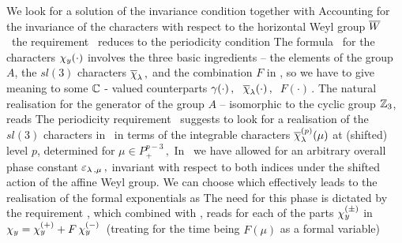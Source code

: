 We look for a  solution of the invariance condition
%
\eqn{}
%
together with 
%
\eqn{}
%
Accounting for the invariance of the characters
with respect to the horizontal Weyl
group $\overline W$  \resa\ the requirement \Vaa\ reduces to the
periodicity condition
%
\eqn{}
%
The formula \fch\ for the characters $\chi_{y}(\cdot)$ involves
the three basic ingredients -- the elements of the group $A$, the
$sl(3)$ characters $\overline{\chi}_{\lambda}\,,$  and the combination $F$ in
\df, so we have to give meaning to some $\Bbb C$ -  valued
counterparts $\gamma(\cdot)\,,\ $ $\overline{\chi}_{\lambda}(\cdot)\,,\ $
$F(\cdot)\,.$ The natural realisation for the generator of the
group $A$ -- isomorphic to the cyclic group $\Bbb Z_3$, reads
%
\eqn{}
%
The periodicity requirement \Vaaa\  suggests to look for a 
realisation of the $sl(3)$ characters in \fch\ 
in terms of the integrable characters $\overline{\chi}_{\lambda}^{(p)}(\mu)$ at
(shifted) level $p$, determined for $\mu\in P_+^{p-3}\,, $
%
\eqn{}
%
 In
\inch\  we have allowed for an arbitrary overall phase constant
$\varepsilon_{\lambda\,,\mu}\,,$ invariant with respect to both indices
under the shifted action of the affine Weyl group.  We can choose
%
\eqn{}
%
which  effectively leads to the realisation of the formal
exponentials as
%
\eqn{}
%
The need for this phase is dictated by the requirement
\Ve,
which combined with
\scur,  \alca{} reads 
for each of the  parts $\chi_y^{(\pm)}$ in   $\chi_y=\chi_y^{(+)} 
+F\, \chi_y^{(-)}\,$ 
 (treating for the time being $F(\mu)$ as a 
formal variable)
\eqn{}
%

